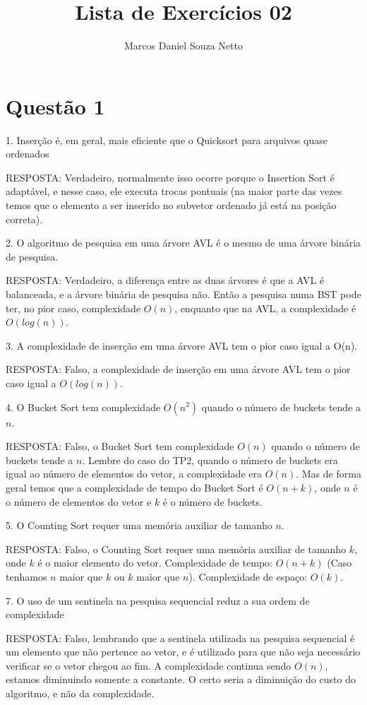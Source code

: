 \documentclass{article}
\begin{document}
\title{Lista de Exercícios 02}
\author{Marcos Daniel Souza Netto}
\maketitle
\section{Questão 1}

1. Inserção é, em geral, mais eficiente que o Quicksort para arquivos quase ordenados

RESPOSTA: Verdadeiro, normalmente isso ocorre porque o Insertion Sort é adaptável, e nesse caso, ele executa trocas pontuais (na maior parte das vezes temos que o elemento a ser inserido no subvetor ordenado já está na posição correta).

2. O algoritmo de pesquisa em uma árvore AVL é o mesmo de uma árvore binária de pesquisa.

RESPOSTA: Verdadeiro, a diferença entre as duas árvores é que a AVL é balanceada, e a árvore binária de pesquisa não. Então a pesquisa numa BST pode ter, no pior caso, complexidade $O(n)$, enquanto que na AVL, a complexidade é $O(log(n))$.

3. A complexidade de inserção em uma árvore AVL tem o pior caso igual a O(n).

RESPOSTA: Falso, a complexidade de inserção em uma árvore AVL tem o pior caso igual a $O(log(n))$.

4. O Bucket Sort tem complexidade $O(n^2)$ quando o número de buckets tende a $n$.

RESPOSTA: Falso, o Bucket Sort tem complexidade $O(n)$ quando o número de buckets tende a $n$. Lembre do caso do TP2, quando o número de buckets era igual ao número de elementos do vetor, a complexidade era $O(n)$. 
Mas de forma geral temos que a complexidade de tempo do Bucket Sort é $O(n+k)$, onde $n$ é o número de elementos do vetor e $k$ é o número de buckets.


5. O Counting Sort requer uma memória auxiliar de tamanho $n$. 

RESPOSTA: Falso, o Counting Sort requer uma memória auxiliar de tamanho $k$, onde $k$ é o maior elemento do vetor. 
Complexidade de tempo: $O(n+k)$ (Caso tenhamos $n$ maior que $k$ ou $k$ maior que $n$). 
Complexidade de espaço: $O(k)$.  

7. O uso de um sentinela na pesquisa sequencial reduz a sua ordem de complexidade

RESPOSTA: Falso, lembrando que a sentinela utilizada na pesquisa sequencial é um elemento que não pertence ao vetor, e é utilizado para que não seja necessário verificar se o vetor chegou ao fim. 
A complexidade continua sendo $O(n)$, estamos diminuindo somente a constante. O certo seria a diminuição do custo do algoritmo, e não da complexidade.
\end{document}
